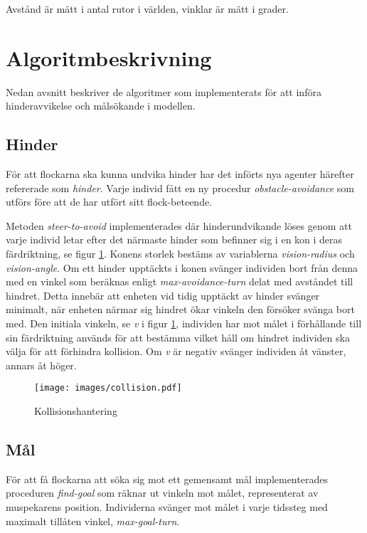 \documentclass[titlepage, a4paper, 12pt]{article}
\begin{document}
Avstånd är mätt i antal rutor i världen, vinklar är mätt i grader.

\section{Algoritmbeskrivning}
Nedan avsnitt beskriver de algoritmer som implementerats för att
införa hinderavvikelse och målsökande i modellen.

\subsection{Hinder}\label{algo:hinder}
För att flockarna ska kunna undvika hinder har det införts nya agenter
härefter refererade som \textit{hinder}. Varje individ fått en ny
procedur \textit{obstacle-avoidance} som utförs före att de har utfört
sitt flock-beteende.

Metoden \textit{steer-to-avoid} implementerades där hinderundvikande
löses genom att varje individ letar efter det närmaste hinder som
befinner sig i en kon i deras färdriktning, se figur
\ref{fig:collision}. Konens storlek bestäms av variablerna
\textit{vision-radius} och \textit{vision-angle}. Om ett hinder
upptäckts i konen svänger individen bort från denna med en vinkel som
beräknas enligt \textit{max-avoidance-turn} delat med avståndet till
hindret. Detta innebär att enheten vid tidig upptäckt av hinder
svänger minimalt, när enheten närmar sig hindret ökar vinkeln den
försöker svänga bort med. Den initiala vinkeln, se \textit{v} i figur
\ref{fig:collision}, individen har mot målet i förhållande till sin
färdriktning används för att bestämma vilket håll om hindret individen
ska välja för att förhindra kollision. Om \textit{v} är negativ
svänger individen åt vänster, annars åt höger.

\begin{figure}[H]
  \begin{center}
    \texttt{[image: images/collision.pdf]}
    \caption{Kollisionshantering}
    \label{fig:collision}
  \end{center}
\end{figure}

\subsection{Mål}
För att få flockarna att söka sig mot ett gemensamt mål
implementerades proceduren \textit{find-goal} som räknar ut vinkeln
mot målet, representerat av mus\-pekarens position. Individerna svänger
mot målet i varje tidssteg med maximalt tillåten vinkel,
\textit{max-goal-turn}.
\end{document}
